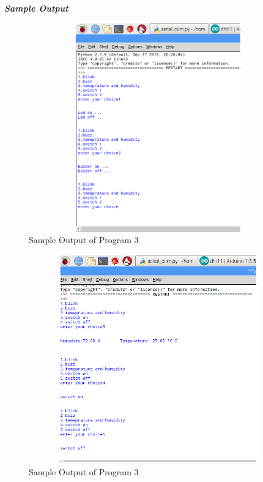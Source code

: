 \documentclass[12pt,a4paper]{article}
\begin{document}
\begin{flushleft}
\textbf{\textit{Sample Output}} \\
\begin{figure}[h!]
    \centering
    \includegraphics[width=12cm, height=9cm]{Lab3_Output_1.png}
    \caption{Sample Output of Program 3}
\end{figure}
\begin{figure}[h!]
    \centering
    \includegraphics[width=12cm, height=9cm]{Lab3_Output_2.png}
    \caption{Sample Output of Program 3}
\end{figure}
\end{flushleft}\vspace{6.5cm}
\end{document}
